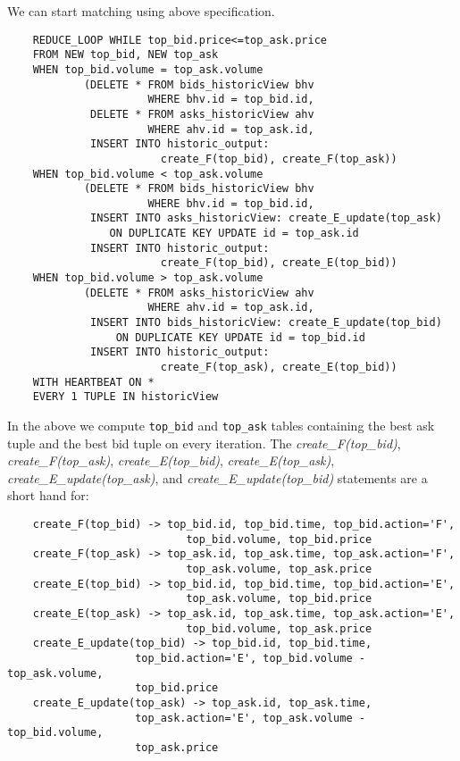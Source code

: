 \documentclass{article}
\begin{document}
We can start matching using above specification.

\begin{verbatim}  
    REDUCE_LOOP WHILE top_bid.price<=top_ask.price
    FROM NEW top_bid, NEW top_ask
    WHEN top_bid.volume = top_ask.volume 
            (DELETE * FROM bids_historicView bhv 
                      WHERE bhv.id = top_bid.id,
             DELETE * FROM asks_historicView ahv 
                      WHERE ahv.id = top_ask.id,
             INSERT INTO historic_output: 
                        create_F(top_bid), create_F(top_ask))
    WHEN top_bid.volume < top_ask.volume 
            (DELETE * FROM bids_historicView bhv 
                      WHERE bhv.id = top_bid.id,
             INSERT INTO asks_historicView: create_E_update(top_ask) 
                ON DUPLICATE KEY UPDATE id = top_ask.id
             INSERT INTO historic_output:
                        create_F(top_bid), create_E(top_bid))
    WHEN top_bid.volume > top_ask.volume 
            (DELETE * FROM asks_historicView ahv 
                      WHERE ahv.id = top_ask.id,
             INSERT INTO bids_historicView: create_E_update(top_bid) 
                 ON DUPLICATE KEY UPDATE id = top_bid.id
             INSERT INTO historic_output:
                        create_F(top_ask), create_E(top_bid))
    WITH HEARTBEAT ON *
    EVERY 1 TUPLE IN historicView
\end{verbatim}

In the above we compute {\tt top\_bid} and {\tt top\_ask} tables containing the best ask tuple and the best bid tuple on every iteration. The \emph{create\_F(top\_bid)}, \emph{create\_F(top\_ask)}, \emph{create\_E(top\_bid)}, \emph{create\_E(top\_ask)}, \emph{create\_E\_update(top\_ask)}, and \emph{create\_E\_update(top\_bid)} statements are a short hand for:

\begin{verbatim}
    create_F(top_bid) -> top_bid.id, top_bid.time, top_bid.action='F',
                            top_bid.volume, top_bid.price
    create_F(top_ask) -> top_ask.id, top_ask.time, top_ask.action='F',
                            top_ask.volume, top_ask.price
    create_E(top_bid) -> top_bid.id, top_bid.time, top_bid.action='E',
                            top_ask.volume, top_bid.price
    create_E(top_ask) -> top_ask.id, top_ask.time, top_ask.action='E',
                            top_bid.volume, top_ask.price
    create_E_update(top_bid) -> top_bid.id, top_bid.time,
                    top_bid.action='E', top_bid.volume - top_ask.volume,
                    top_bid.price
    create_E_update(top_ask) -> top_ask.id, top_ask.time,
                    top_ask.action='E', top_ask.volume - top_bid.volume,
                    top_ask.price
\end{verbatim}
\end{document}

